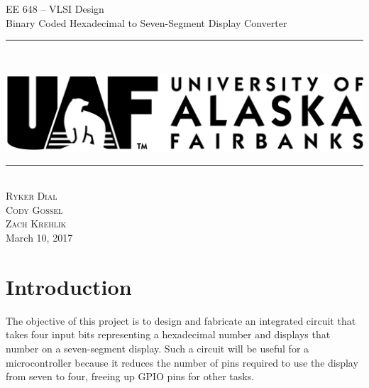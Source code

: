 \documentclass[12pt]{article}
\newcommand{\boldrule}{\rule{\linewidth}{2pt}} %
\begin{document}
\thispagestyle{empty}
\newpage
\vspace*{3cm}
\begin{center}
{\Huge EE 648 -- VLSI Design\\[.5cm]
Binary Coded Hexadecimal to Seven-Segment Display Converter}
\end{center}
\vspace{5mm}
\boldrule\\
\begin{center}
\includegraphics{uaflogo.png}\\[.5cm]
\boldrule\\[3cm]
{\Large
\textsc{Ryker Dial}\\
\textsc{Cody Gossel}\\
\textsc{Zach Krehlik}\\[1cm]
March 10, 2017
}
\end{center}


\newpage

\thispagestyle{empty}
\tableofcontents

\newpage

\setcounter{page}{1}


\section{Introduction}
The objective of this project is to design and fabricate an integrated circuit that takes four input bits representing a hexadecimal number and displays that number on a seven-segment display.
Such a circuit will be useful for a microcontroller because it reduces the number of pins required to use the display from seven to four, freeing up GPIO pins for other tasks.

\end{document}

